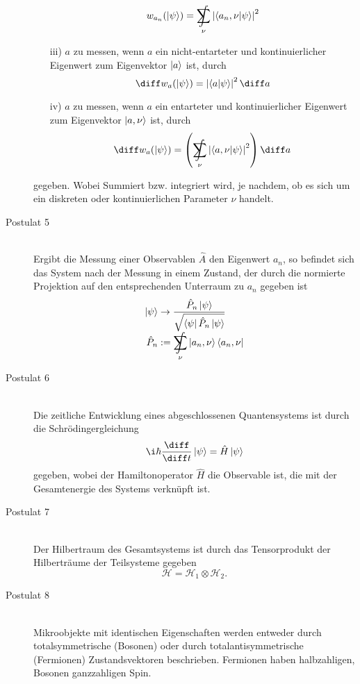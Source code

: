 \documentclass[11pt]{article}
\DeclareMathOperator*{\SumInt}{%
\mathchoice%
  {\ooalign{$\displaystyle\sum$\cr\hidewidth$\displaystyle\int$\hidewidth\cr}}
  {\ooalign{\raisebox{.14\height}{\scalebox{.7}{$\textstyle\sum$}}\cr\hidewidth$\textstyle\int$\hidewidth\cr}}
  {\ooalign{\raisebox{.2\height}{\scalebox{.6}{$\scriptstyle\sum$}}\cr$\scriptstyle\int$\cr}}
  {\ooalign{\raisebox{.2\height}{\scalebox{.6}{$\scriptstyle\sum$}}\cr$\scriptstyle\int$\cr}}
}
\numberwithin{equation}{section}
\begin{document}
\begin{description}
\begin{itemize}
						\begin{equation}
							w_{a_n}(\Ket{\psi}) = \SumInt_\nu \left|\braket{a_n ,\nu|\psi}\right|^2
						\end{equation}
						\item[iii)] $a$ zu messen, wenn $a$ ein nicht-entarteter und kontinuierlicher Eigenwert zum Eigenvektor $\Ket{a}$ ist, durch
						\begin{equation}
							\diff w_a(\Ket{\psi}) = \left| \braket{a|\psi} \right|^2 \diff a
						\end{equation}
						\item[iv)] $a$ zu messen, wenn $a$ ein entarteter und kontinuierlicher Eigenwert zum Eigenvektor $\Ket{a, \nu}$ ist, durch
						\begin{equation}
							\diff w_a(\Ket{\psi}) = \left( \SumInt_\nu \left| \braket{a,\nu |\psi} \right|^2 \right) \diff a
						\end{equation}
					\end{itemize}
					gegeben. Wobei Summiert bzw. integriert wird, je nachdem, ob es sich um ein diskreten oder kontinuierlichen Parameter $\nu$ handelt.
				\item[Postulat 5]\hfill \\
					Ergibt die Messung einer Observablen $\hat{A}$ den Eigenwert $a_n$, so befindet sich das System nach der Messung in einem Zustand, der durch die normierte Projektion auf den entsprechenden Unterraum zu $a_n$ gegeben ist
					\begin{equation}
						\begin{aligned}
							\Ket{\psi} &\rightarrow \frac{\hat{P}_n\Ket{\psi}} {\sqrt{\Bra{\psi}\hat{P}_n\Ket{\psi}}} \\
							\hat{P}_n &:= \SumInt_\nu \Ket{a_n,\nu}\Bra{a_n,\nu} \\
						\end{aligned}
					\end{equation}
				\item[Postulat 6]\hfill \\
					Die zeitliche Entwicklung eines abgeschlossenen Quantensystems ist durch die Schrödingergleichung
					\begin{equation}
						\i\hbar\tder{}{t}\Ket{\psi} = \hat{H}\Ket{\psi}
					\end{equation}
					gegeben, wobei der Hamiltonoperator $\hat{H}$ die Observable ist, die mit der Gesamtenergie des Systems verknüpft ist.
				\item[Postulat 7]\hfill \\
					Der Hilbertraum des Gesamtsystems ist durch das Tensorprodukt der Hilberträume der Teilsysteme gegeben
					\begin{equation}
						\mathcal{H} = \mathcal{H}_1 \otimes \mathcal{H}_2.
					\end{equation}
				\item[Postulat 8]\hfill \\
					Mikroobjekte mit identischen Eigenschaften werden entweder durch totalsymmetrische (Bosonen) oder durch totalantisymmetrische (Fermionen) Zustandsvektoren beschrieben. Fermionen haben halbzahligen, Bosonen ganzzahligen Spin.
			\end{description}
\end{document}
